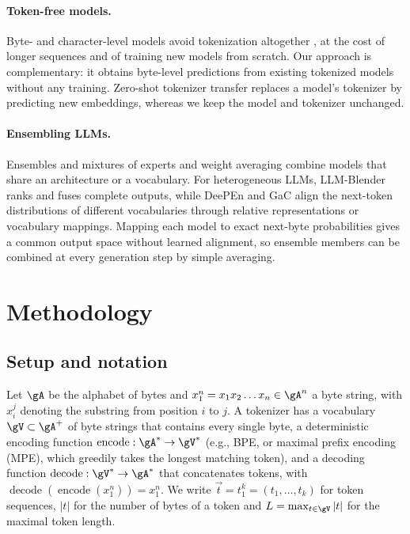 \documentclass{article} %
\newcommand{\enc}{\operatorname{encode}}
\newcommand{\dec}{\operatorname{decode}}
\newcommand{\tseq}{\vec{t}}
\begin{document}
\paragraph{Token-free models.}
Byte- and character-level models avoid tokenization altogether \citep{xue2022byt5,clark2022canine,tay2022charformer,yu2023megabyte}, at the cost of longer sequences and of training new models from scratch. Our approach is complementary: it obtains byte-level predictions from existing tokenized models without any training. Zero-shot tokenizer transfer \citep{minixhofer2024zett} replaces a model's tokenizer by predicting new embeddings, whereas we keep the model and tokenizer unchanged.

\paragraph{Ensembling LLMs.}
Ensembles and mixtures of experts \citep{shazeer2017moe,jiang2024mixtral} and weight averaging \citep{wortsman2022soups} combine models that share an architecture or a vocabulary. For heterogeneous LLMs, LLM-Blender \citep{jiang2023llmblender} ranks and fuses complete outputs, while DeePEn \citep{huang2024deepen} and GaC \citep{yu2024gac} align the next-token distributions of different vocabularies through relative representations or vocabulary mappings. Mapping each model to exact next-byte probabilities gives a common output space without learned alignment, so ensemble members can be combined at every generation step by simple averaging.

\section{Methodology}
\label{sec:method}
\subsection{Setup and notation}
\label{sec:setup}
Let $\gA$ be the alphabet of bytes and $x_1^n = x_1 x_2 \dots x_n \in \gA^n$ a byte string, with $x_i^j$ denoting the substring from position $i$ to $j$. A tokenizer has a vocabulary $\gV \subset \gA^{+}$ of byte strings that contains every single byte, a deterministic encoding function $\enc: \gA^* \to \gV^*$ (e.g., BPE, or maximal prefix encoding (MPE), which greedily takes the longest matching token), and a decoding function $\dec: \gV^* \to \gA^*$ that concatenates tokens, with $\dec(\enc(x_1^n)) = x_1^n$. We write $\tseq = t_1^k = (t_1,\dots,t_k)$ for token sequences, $|t|$ for the number of bytes of a token and $L = \max_{t\in\gV}|t|$ for the maximal token length.
\end{document}
